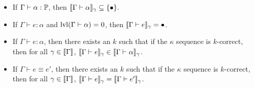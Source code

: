 \begin{theorem}[Soundness]\label{thm:sound}
\begin{itemize}
\item If $\Gamma\vdash \alpha:\P$, then $\scott{\Gamma\vdash\alpha}_\gamma\subseteq\{\bullet\}$.
\item If $\Gamma\vdash e:\alpha$ and $\lvl(\Gamma\vdash \alpha)=0$, then $\scott{\Gamma\vdash e}_\gamma=\bullet$.
\item If $\Gamma\vdash e:\alpha$, then there exists an $k$ such that if the $\kappa$ sequence is $k$-correct, then for all $\gamma\in\scott{\Gamma}$, $\scott{\Gamma\vdash e}_\gamma\in \scott{\Gamma\vdash \alpha}_\gamma$.
\item If $\Gamma\vdash e\equiv e'$, then there exists an $k$ such that if the $\kappa$ sequence is $k$-correct, then for all $\gamma\in\scott{\Gamma}$, $\scott{\Gamma\vdash e}_\gamma=\scott{\Gamma\vdash e'}_\gamma$.
\end{itemize}
\end{theorem}
